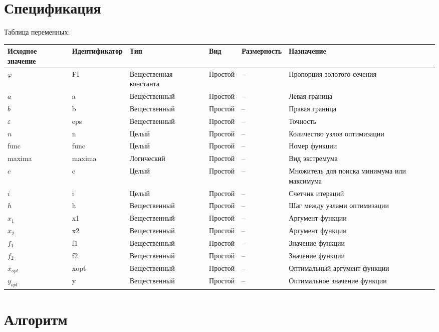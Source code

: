 \documentclass[a4paper]{article}
\begin{document}
\section{Спецификация}
Таблица переменных:
{
\fontsize{10pt}{12pt}\selectfont
\begin{longtable}{|p{1.5cm}|l|p{2.5cm}|l|p{2cm}|p{4.5cm}|}
\hline
Исходное значение & Идентификатор & Тип & Вид & Размерность & Назначение\\
\hline
$\varphi$ & FI & Вещественная константа & Простой & -- &
Пропорция золотого сечения\\
\hline
$a$ & a & Вещественный & Простой & -- & Левая граница\\
\hline
$b$ & b & Вещественный & Простой & -- & Правая граница\\
\hline
$\varepsilon$ & eps & Вещественный & Простой & -- & Точность\\
\hline
$n$ & n & Целый & Простой & -- & Количество узлов оптимизации\\
\hline
func & func & Целый & Простой & -- & Номер функции\\
\hline
maxima & maxima & Логический & Простой & -- & Вид экстремума\\
\hline
$c$ & c & Целый & Простой & -- & Множитель для поиска минимума или максимума\\
\hline
$i$ & i & Целый & Простой & -- & Счетчик итераций\\
\hline
$h$ & h & Вещественный & Простой & -- & Шаг между узлами оптимизации\\
\hline
$x_1$ & x1 & Вещественный & Простой & -- & Аргумент функции\\
\hline
$x_2$ & x2 & Вещественный & Простой & -- & Аргумент функции\\
\hline
$f_1$ & f1 & Вещественный & Простой & -- & Значение функции\\
\hline
$f_2$ & f2 & Вещественный & Простой & -- & Значение функции\\
\hline
$x_{opt}$ & xopt & Вещественный & Простой & -- & Оптимальный аргумент функции\\
\hline
$y_{opt}$ & y & Вещественный & Простой & -- & Оптимальное значение функции\\
\hline
\end{longtable}
}

\newpage
\section{Алгоритм}
\end{document}
